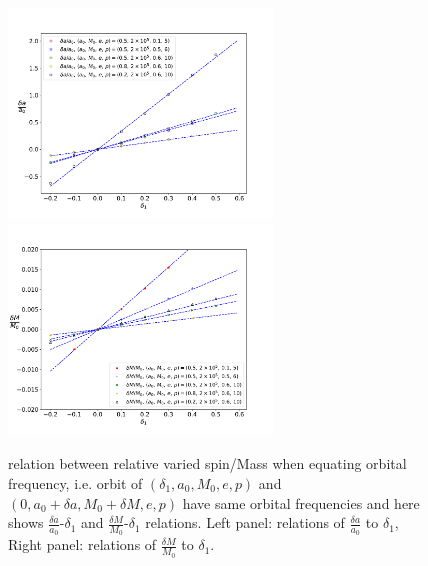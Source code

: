 \documentclass{article}
\begin{document}
\begin{figure}[!ht]
	\centering
	\includegraphics[width=7cm]{d1_spin_linear.pdf}
	\includegraphics[width=7cm]{d1_M.pdf}
	\caption{relation between relative varied spin/Mass when equating orbital frequency, i.e. orbit of $(\delta_1, a_0, M_0,e,p)$ and $(0,a_0+\delta a, M_0+\delta M,e,p)$ have same orbital frequencies and here shows $\frac{\delta a}{a_0}$-$\delta_1$ and $\frac{\delta M}{M_0}$-$\delta_1$ relations. Left panel: relations of $\frac{\delta a}{a_0}$ to $\delta_1$, Right panel: relations of $\frac{\delta M}{M_0}$ to $\delta_1$.}
	\label{da_linear}
\end{figure}
\end{document}
